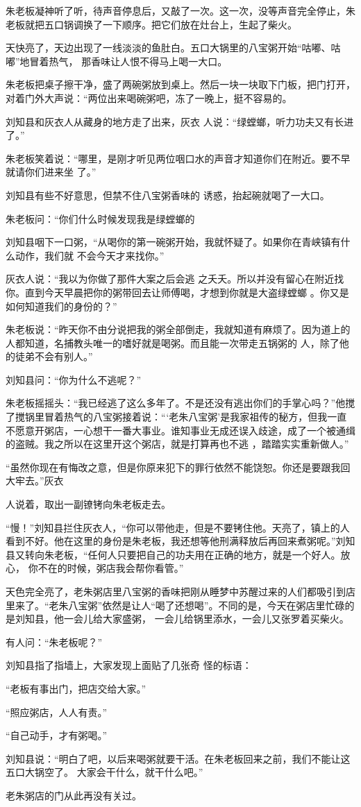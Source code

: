 \documentclass{article}
\begin{document}
朱老板凝神听了听，待声音停息后，又敲了一次。这一次，没等声音完全停止，朱老板就把五口锅调换了一下顺序。把它们放在灶台上，生起了柴火。

天快亮了，天边出现了一线淡淡的鱼肚白。五口大锅里的八宝粥开始“咕嘟、咕嘟”地冒着热气，
那香味让人恨不得马上喝一大口。 

\newpage

朱老板把桌子擦干净，盛了两碗粥放到桌上。然后一块一块取下门板，把门打开，对着门外大声说：“两位出来喝碗粥吧，冻了一晚上，挺不容易的。

刘知县和灰衣人从藏身的地方走了出来，灰衣
人说：“绿螳螂，听力功夫又有长进了。” 

朱老板笑着说：“哪里，是刚才听见两位咽口水的声音才知道你们在附近。要不早就请你们进来坐
了。” 

刘知县有些不好意思，但禁不住八宝粥香味的
诱惑，抬起碗就喝了一大口。 

朱老板问：“你们什么时候发现我是绿螳螂的

刘知县咽下一口粥，“从喝你的第一碗粥开始，我就怀疑了。如果你在青峡镇有什么动作，我们就
不会今天才来找你。” 

灰衣人说：“我以为你做了那件大案之后会逃
\newpage
之夭夭。所以并没有留心在附近找你。直到今天早晨把你的粥带回去让师傅喝，才想到你就是大盗绿螳螂
。你又是如何知道我们的身份的？” 

朱老板说：“昨天你不由分说把我的粥全部倒走，我就知道有麻烦了。因为道上的人都知道，名捕教头唯一的嗜好就是喝粥。而且能一次带走五锅粥的
人，除了他的徒弟不会有别人。” 


刘知县问：“你为什么不逃呢？” 

朱老板摇摇头：“我已经逃了这么多年了。不是还没有逃出你们的手掌心吗？”他搅了搅锅里冒着热气的八宝粥接着说：“‘老朱八宝粥’是我家祖传的秘方，但我一直不愿意开粥店，一心想干一番大事业。谁知事业无成还误入歧途，成了一个被通缉的盗贼。我之所以在这里开这个粥店，就是打算再也不逃
，踏踏实实重新做人。” 

“虽然你现在有悔改之意，但是你原来犯下的罪行依然不能饶恕。你还是要跟我回大牢去。”灰衣
\newpage

人说着，取出一副镣铐向朱老板走去。 

“慢！”刘知县拦住灰衣人，“你可以带他走，但是不要铐住他。天亮了，镇上的人看到不好。他在这里的身份是朱老板，我还想等他刑满释放后再回来煮粥呢。”刘知县又转向朱老板，“任何人只要把自己的功夫用在正确的地方，就是一个好人。放心，
你不在的时候，粥店我会帮你看管。” 

天色完全亮了，老朱粥店里八宝粥的香味把刚从睡梦中苏醒过来的人们都吸引到店里来了。“老朱八宝粥”依然是让人“喝了还想喝”。不同的是，今天在粥店里忙碌的是刘知县，他一会儿给大家盛粥，
一会儿给锅里添水，一会儿又张罗着买柴火。 


有人问：“朱老板呢？” 

刘知县指了指墙上，大家发现上面贴了几张奇
怪的标语： 


\newpage

“老板有事出门，把店交给大家。” 


“照应粥店，人人有责。” 


“自己动手，才有粥喝。” 

刘知县说：“明白了吧，以后来喝粥就要干活。在朱老板回来之前，我们不能让这五口大锅空了。
大家会干什么，就干什么吧。” 

老朱粥店的门从此再没有关过。
\end{document}

